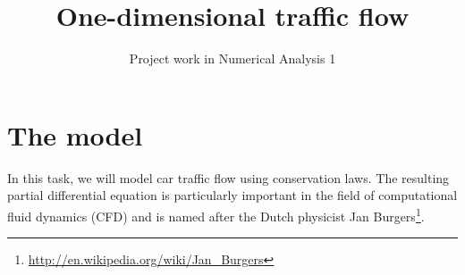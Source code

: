 \documentclass[a4paper,10pt]{article}
\title{\bf One-dimensional traffic flow}
\author{Project work in Numerical Analysis 1}
\begin{document}
\maketitle


\section*{The model}
In this task, we will model car traffic flow using conservation laws. The resulting partial differential equation is particularly important in the field of computational fluid dynamics (CFD) and is named after the Dutch physicist Jan Burgers\footnote{\href{http://en.wikipedia.org/wiki/Jan_Burgers}{http://en.wikipedia.org/wiki/Jan\_Burgers}}.
\end{document}
